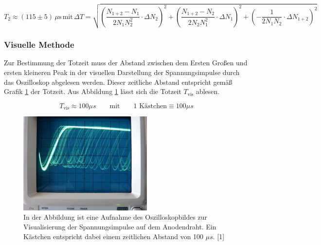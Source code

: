 \documentclass[titlepage = firstcover]{scrartcl}
\begin{document}
                \begin{equation}
                    T_2 \approx \left(115 \pm 5\right) \, \mu \text{s} \, \text{mit} \, \Delta T = \sqrt{\left(\frac{N_{1+2}-N_1}{2N_1N_2^2} \cdot \Delta N_2\right)^2 + \left(\frac{N_{1+2}-N_2}{2N_2N_1^2} \cdot \Delta N_1\right)^2 + \left(-\frac{1}{2N_1N_2} \cdot \Delta N_{1+2}\right)^2}
                \end{equation}

            \subsubsection*{Visuelle Methode}   
                Zur Bestimmung der Totzeit muss der Abstand zwischen dem Ersten Großen und ersten kleineren Peak in der visuellen Darstellung der Spannungsimpulse durch das Oszilloskop abgelesen 
                werden. Dieser zeitliche Abstand entspricht gemäß Grafik \ref{fig:Zeit} der Totzeit.  Aus Abbildung \ref{fig:Zeit} lässt sich die Totzeit $T_{\text{vis}}$ ablesen.

                \begin{equation*}
                    T_{\text{vis}} \approx 100 \mu s \qquad \text{mit} \qquad \text{1 Kästchen} \equiv 100 \mu s
                \end{equation*}

                \FloatBarrier

                \begin{figure}[h]
                  \centering
                  \includegraphics[width = 0.6\textwidth]{Bilder/Visuell.png}
                  \caption{In der Abbildung ist eine Aufnahme des Oszilloskopbildes zur Visualisierung der Spannungsimpulse auf dem Anodendraht. Ein Kästchen entspricht dabei einem zeitlichen Abstand von 100 $\mu s$. [1]}
                  \label{fig:Zeit}
                \end{figure}
\end{document}
